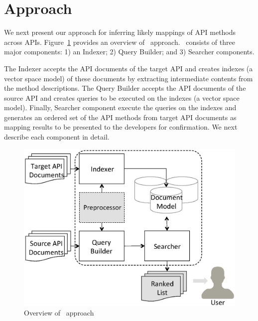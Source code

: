 \section{Approach}
\label{sec:approach}

We next present our approach for inferring 
likely mappings of API methods  across APIs. 
Figure~\ref{fig:approachOverview} provides an overview of \tool\ approach. 
\tool\ consists of three major components: 1) an Indexer; 2) Query Builder; and 3) Searcher components.


The Indexer accepts the API documents of the target API
and creates indexes (a vector space model) of these documents 
by extracting intermediate contents from the method descriptions. 
The Query Builder accepts the API documents of the source API
and creates queries to be executed on the indexes (a vector space model).
Finally, Searcher component execute the queries on the indexes and 
generates an ordered set of the API methods from target API documents as
mapping results to be presented to the developers for confirmation. 
We next describe each component in detail.


\begin{figure}
	\begin{center}
		\includegraphics[scale=0.45,clip=true, trim=120pt 80pt 10pt 80pt]{ApproahOverview.eps}
		\caption{\label{fig:approachOverview} Overview of \tool\ approach}
	\end{center}
\end{figure}


